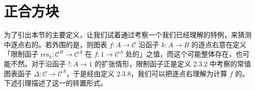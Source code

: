 \providecommand{\HomA}{\mathrm{Hom}_{A}}
\providecommand{\HomB}{\mathrm{Hom}_{B}}
\providecommand{\HomC}{\mathrm{Hom}_{C}}
\providecommand{\HomD}{\mathrm{Hom}_{D}}
\providecommand{\HomE}{\mathrm{Hom}_{E}}
\providecommand{\HomP}{\mathrm{Hom}_{P}}

\section{正合方块}\label{sec:exact-squares}

为了引出本节的主要定义，让我们试着通过考察一个我们已经理解的特例，来猜测\trInfinityCosmos{}中逐点右\trExtension{}的\trUniversalProperty{}。若外围的\trInfinityCosmos{}是\trCartesianClosed{}，则图表 $f\colon A\to\mathcal{C}$ 沿函子 $k\colon A\to B$ 的逐点右\trExtension{}意在定义「限制函子
$\mathrm{res}_{k}\colon\mathcal{C}^{B}\to\mathcal{C}^{A}$ 在\trElement{} $f\colon 1\to\mathcal{C}^{A}$ 处的\trRightAdjoint{}」之值，而这个\trRightAdjoint{}可能整体存在，也可能不然。对于沿函子 $!\colon A\to 1$ 的扩张情形，限制函子正是定义 2.3.2 中考察的常值图表函子
$\Delta\colon\mathcal{C}\to\mathcal{C}^{A}$，于是经由定义 2.3.8，我们可以把逐点右\trExtension{}理解为计算 $f$ 的\trLimit{}。下述引理描述了这一\trUniversalProperty{}的转置形式。


